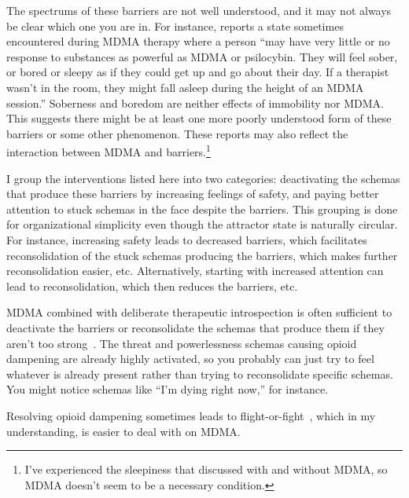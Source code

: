 \documentclass[11pt,oneside]{book}
\let\cite\parencite
\begin{document}
The spectrums of these barriers are not well understood, and it may not always be clear which one you are in. For instance, \textcite[p. 10]{razviPSIP} reports a state sometimes encountered during MDMA therapy where a person \enquote{may have very little or no response to substances as powerful as MDMA or psilocybin. They will feel sober, or bored or sleepy as if they could get up and go about their day. If a therapist wasn't in the room, they might fall asleep during the height of an MDMA session.} Soberness and boredom are neither effects of immobility nor MDMA. This suggests there might be at least one more poorly understood form of these barriers or some other phenomenon. These reports may also reflect the interaction between MDMA and barriers.\footnote{I've experienced the sleepiness that \textcite{razviPSIP} discussed with and without MDMA, so MDMA doesn't seem to be a necessary condition.}

I group the interventions listed here into two categories: deactivating the schemas that produce these barriers by increasing feelings of safety, and paying better attention to stuck schemas in the face despite the barriers. This grouping is done for organizational simplicity even though the attractor state is naturally circular. For instance, increasing safety leads to decreased barriers, which facilitates reconsolidation of the stuck schemas producing the barriers, which makes further reconsolidation easier, etc. Alternatively, starting with increased attention can lead to reconsolidation, which then reduces the barriers, etc.

MDMA combined with deliberate therapeutic introspection is often sufficient to deactivate the barriers or reconsolidate the schemas that produce them if they aren't too strong~\cite{razviPSIP}. The threat and powerlessness schemas causing opioid dampening are already highly activated, so you probably can just try to feel whatever is already present rather than trying to reconsolidate specific schemas. You might notice schemas like \enquote{I'm dying right now,} for instance.

Resolving opioid dampening sometimes leads to flight-or-fight~\cite{kozlowskaDefenseCascade}, which in my understanding, is easier to deal with on MDMA.
\end{document}

